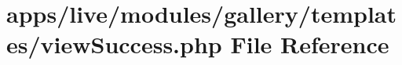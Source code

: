 \hypertarget{live_2modules_2gallery_2templates_2view_success_8php}{\section{apps/live/modules/gallery/templates/view\-Success.php File Reference}
\label{live_2modules_2gallery_2templates_2view_success_8php}
}
